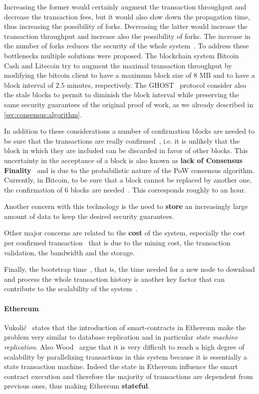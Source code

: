Increasing the former would certainly augment the transaction throughput and
decrease the transaction fees, but it would also slow down the propagation time,
thus increasing the possibility of forks. Decreasing the latter would increase
the transaction throughput and increase also the possibility of forks. The
increase in the number of forks reduces the security of the whole
system~\cite{bib:ghost}. To address these bottlenecks multiple solutions were
proposed. The blockchain system Bitcoin Cash and Litecoin try to augment the
maximal transaction throughput by modifying the bitcoin client to have a maximum
block size of $8$ MB and to have a block interval of $2.5$ minutes,
respectively. The GHOST~\cite{bib:ghost} protocol consider also the stale blocks
to permit to diminish the block interval while preserving the same security
guarantees of the original proof of work, as we already described in
\autoref{sec:consensus:algorithm}.

In addition to these considerations a number of confirmation blocks are needed
to be sure that the transactions are really confirmed~\cite{bib:taxonomy}, i.e.
it is unlikely that the block in which they are included can be discarded in
favor of other blocks. This uncertainty in the acceptance of a block is also
known as \textbf{lack of Consensus Finality}~\cite{bib:the-quest} and is due to
the probabilistic nature of the PoW consensus algorithm. Currently, in Bitcoin,
to be sure that a block cannot be replaced by another one, the confirmation of 6
blocks are needed~\cite{bib:masteringbitcoin}. This corresponds roughly to an
hour.

Another concern with this technology is the need to \textbf{store} an
increasingly large amount of data to keep the desired security guarantees.

Other major concerns are related to the \textbf{cost} of the system, especially
the cost per confirmed transaction~\cite{bib:scaling-croman} that is due to the
mining cost, the transaction validation, the bandwidth and the storage.

Finally, the bootstrap time~\cite{bib:scaling-croman}, that is, the time needed
for a new node to download and process the whole transaction history is another
key factor that can contribute to the scalability of the
system~\cite{bib:scaling-croman}.

\paragraph{Ethereum} Vukoli\'c~\cite{bib:the-quest} states that the introduction
of smart-contracts in Ethereum make the problem very similar to database
replication and in particular \emph{state machine replication}. Also
Wood~\cite{wood2018ethereum} argue that it is very difficult to reach a high
degree of scalability by parallelizing transactions in this system because it is
essentially a state transaction machine. Indeed the state in Ethereum influence
the smart contract execution and therefore the majority of transactions are
dependent from previous ones, thus making Ethereum \textbf{stateful}.



